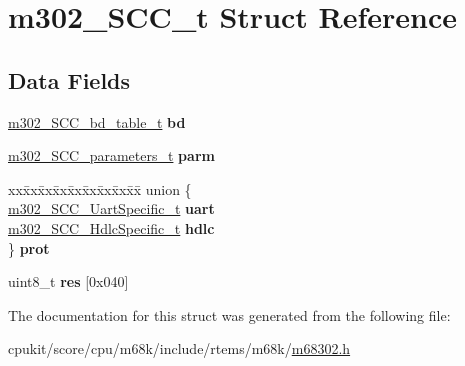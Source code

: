\hypertarget{structm302__SCC__t}{}\section{m302\+\_\+\+S\+C\+C\+\_\+t Struct Reference}
\label{structm302__SCC__t}
\subsection*{Data Fields}
\begin{DoxyCompactItemize}
\item 
\mbox{\label{structm302__SCC__t_a2e7239cc13c92f943b5be6bba5a24346}} 
\mbox{\hyperlink{structm302__SCC__bd__table__t}{m302\+\_\+\+S\+C\+C\+\_\+bd\+\_\+table\+\_\+t}} {\bfseries bd}
\item 
\mbox{\label{structm302__SCC__t_a9a96824072d1a015b051c66ff6f5465a}} 
\mbox{\hyperlink{structm302__SCC__parameters__t}{m302\+\_\+\+S\+C\+C\+\_\+parameters\+\_\+t}} {\bfseries parm}
\item 
\mbox{\label{structm302__SCC__t_a2490e09cb66688ebb2eb7b07128d308d}} 
\begin{tabbing}
xx\=xx\=xx\=xx\=xx\=xx\=xx\=xx\=xx\=\kill
union \{\\
\>\mbox{\hyperlink{structm302__SCC__UartSpecific__t}{m302\_SCC\_UartSpecific\_t}} {\bfseries uart}\\
\>\mbox{\hyperlink{structm302__SCC__HdlcSpecific__t}{m302\_SCC\_HdlcSpecific\_t}} {\bfseries hdlc}\\
\} {\bfseries prot}\\

\end{tabbing}\item 
\mbox{\label{structm302__SCC__t_ac5fb66b39b0cf963a635f027be043acb}} 
uint8\+\_\+t {\bfseries res} \mbox{[}0x040\mbox{]}
\end{DoxyCompactItemize}


The documentation for this struct was generated from the following file\+:\begin{DoxyCompactItemize}
\item 
cpukit/score/cpu/m68k/include/rtems/m68k/\mbox{\hyperlink{m68302_8h}{m68302.\+h}}\end{DoxyCompactItemize}
